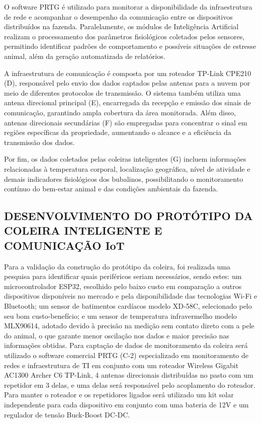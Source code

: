 \documentclass[11pt,a4paper]{article}
\begin{document}
O software PRTG é utilizado para monitorar a disponibilidade da infraestrutura de rede
e acompanhar o desempenho da comunicação entre os dispositivos distribuídos na fazenda.
Paralelamente, os módulos de Inteligência Artificial realizam o processamento dos parâmetros
fisiológicos coletados pelos sensores, permitindo identificar padrões de comportamento e possíveis
situações de estresse animal, além da geração automatizada de relatórios.

A infraestrutura de comunicação é composta por um roteador TP-Link CPE210 (D), responsável pelo envio dos dados captados pelas antenas para a nuvem por meio de diferentes
protocolos de transmissão. O sistema também utiliza uma antena direcional principal (E), encarregada da recepção e emissão dos sinais de comunicação, garantindo ampla cobertura da área
monitorada. Além disso, antenas direcionais secundárias (F) são empregadas para concentrar o
sinal em regiões específicas da propriedade, aumentando o alcance e a eficiência da transmissão
dos dados.

Por fim, os dados coletados pelas coleiras inteligentes (G) incluem informações relacionadas à
temperatura corporal, localização geográfica, nível de atividade e demais indicadores fisiológicos dos bubalinos, possibilitando o monitoramento contínuo do bem-estar animal e das condições
ambientais da fazenda.

\subsection{DESENVOLVIMENTO DO PROTÓTIPO DA COLEIRA INTELIGENTE E
COMUNICAÇÃO IoT}

Para a validação da construção do protótipo da coleira, foi realizada uma pesquisa para identificar quais periféricos seriam necessários, sendo estes: um microcontrolador ESP32, escolhido
pelo baixo custo em comparação a outros dispositivos disponíveis no mercado e pela disponibilidade das tecnologias Wi-Fi e Bluetooth; um sensor de batimentos cardíacos modelo XD-58C,
selecionado pelo seu bom custo-benefício; e um sensor de temperatura infravermelho modelo
MLX90614, adotado devido à precisão na medição sem contato direto com a pele do animal,
o que garante menor oscilação nos dados e maior precisão nas informações obtidas. Para captação de dados de monitoramento da coleira será utilizado o software comercial PRTG (C-2)
especializado em monitoramento de redes e infraestrutura de TI em conjunto com um roteador
Wireless Gigabit AC1300 Archer C6 TP-Link, 4 antenas direcionais distribuídas no pasto com
um repetidor em 3 delas, e uma delas será responsável pelo acoplamento do roteador. Para
manter o roteador e os repetidores ligados será utilizado um kit solar independente para cada
dispositivo em conjunto com uma bateria de 12V e um regulador de tensão Buck-Boost DC-DC.
\end{document}
